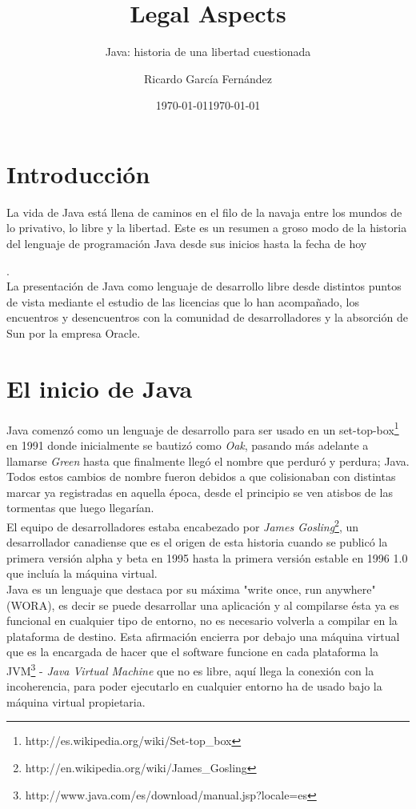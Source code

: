 \documentclass[11pt]{scrartcl}
\title{\textbf{Legal Aspects}}
\subtitle{Java: historia de una libertad cuestionada}
\author{Ricardo García Fernández}
\date{\today}
\begin{document}
\maketitle

\tableofcontents

\section{Introducción}

La vida de Java está llena de caminos en el filo de la navaja entre los mundos de lo privativo, lo libre y la libertad. Este es un resumen a groso modo de la historia del lenguaje de programación Java desde sus inicios hasta la fecha de hoy \date{\today}.\\
La presentación de Java como lenguaje de desarrollo libre desde distintos puntos de vista mediante el estudio de las licencias que lo han acompañado, los encuentros y desencuentros con la comunidad de desarrolladores y la absorción de Sun por la empresa Oracle.

\section{El inicio de Java}

Java comenzó como un lenguaje de desarrollo para ser usado en un set-top-box\footnote{http://es.wikipedia.org/wiki/Set-top\_box} en 1991 donde inicialmente se bautizó como \emph{Oak}, pasando más adelante a llamarse \emph{Green} hasta que finalmente llegó el nombre que perduró y perdura; Java.
Todos estos cambios de nombre fueron debidos a que colisionaban con distintas marcar ya registradas en aquella época, desde el principio se ven atisbos de las tormentas que luego llegarían.\\
El equipo de desarrolladores estaba encabezado por \emph{James Gosling}\footnote{http://en.wikipedia.org/wiki/James\_Gosling}, un desarrollador canadiense que es el origen de esta historia cuando se publicó la primera versión alpha y beta en 1995 hasta la primera versión estable en 1996 1.0 que incluía la máquina virtual.\\
Java es un lenguaje que destaca por su máxima "write once, run anywhere" (WORA), es decir se puede desarrollar una aplicación y al compilarse ésta ya es funcional en cualquier tipo de entorno, no es necesario volverla a compilar en la plataforma de destino. Esta afirmación encierra por debajo una máquina virtual que es la encargada de hacer que el software funcione en cada plataforma la JVM\footnote{http://www.java.com/es/download/manual.jsp?locale=es} - \emph{Java Virtual Machine} que no es libre, aquí llega la conexión con la incoherencia, para poder ejecutarlo en cualquier entorno ha de usado bajo la máquina virtual propietaria.
\end{document}
